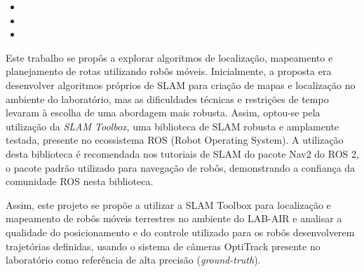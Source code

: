 \begin{itemize}
    \item {}
    \item {}
    \item {}
\end{itemize}



Este trabalho se propôs a explorar algoritmos de localização, mapeamento e planejamento de rotas utilizando robôs móveis. Inicialmente, a proposta era desenvolver algoritmos próprios de SLAM para criação de mapas e localização no ambiente do laboratório, mas as dificuldades técnicas e restrições de tempo levaram à escolha de uma abordagem mais robusta. Assim, optou-se pela utilização da \textit{SLAM Toolbox}\cite{git:slam_toolbox}, uma biblioteca de SLAM robusta e amplamente testada, presente no ecossistema ROS (Robot Operating System). A utilização desta biblioteca é recomendada nos tutoriais de SLAM do pacote Nav2 do ROS 2, o pacote padrão utilizado para navegação de robôs, demonstrando a confiança da comunidade ROS nesta biblioteca.

Assim, este projeto se propõe a utilizar a SLAM Toolbox para localização e mapeamento de robôs móveis terrestres no ambiente do LAB-AIR e analisar a qualidade do posicionamento e do controle utilizado para os robôs desenvolverem trajetórias definidas, usando o sistema de câmeras OptiTrack presente no laboratório como referência de alta precisão (\textit{ground-truth}).

